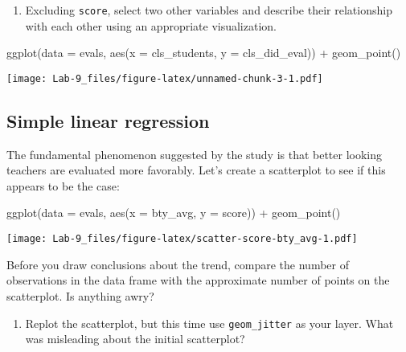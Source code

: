\documentclass[
]{article}
\newenvironment{Shaded}{\begin{snugshade}}{\end{snugshade}}
\newcommand{\AttributeTok}[1]{\textcolor[rgb]{0.77,0.63,0.00}{#1}}
\newcommand{\FunctionTok}[1]{\textcolor[rgb]{0.00,0.00,0.00}{#1}}
\newcommand{\NormalTok}[1]{#1}
\newcommand{\SpecialCharTok}[1]{\textcolor[rgb]{0.00,0.00,0.00}{#1}}
\providecommand{\tightlist}{%
  \setlength{\itemsep}{0pt}\setlength{\parskip}{0pt}}
\begin{document}
\begin{enumerate}
\def\labelenumi{\arabic{enumi}.}
\setcounter{enumi}{2}
\tightlist
\item
  Excluding \texttt{score}, select two other variables and describe
  their relationship with each other using an appropriate visualization.
\end{enumerate}

\begin{Shaded}
\begin{Highlighting}[]
\FunctionTok{ggplot}\NormalTok{(}\AttributeTok{data =}\NormalTok{ evals, }\FunctionTok{aes}\NormalTok{(}\AttributeTok{x =}\NormalTok{ cls\_students, }\AttributeTok{y =}\NormalTok{ cls\_did\_eval)) }\SpecialCharTok{+} \FunctionTok{geom\_point}\NormalTok{()}
\end{Highlighting}
\end{Shaded}

\texttt{[image: Lab-9\_files/figure-latex/unnamed-chunk-3-1.pdf]}

\hypertarget{simple-linear-regression}{%
\subsection{Simple linear regression}\label{simple-linear-regression}}

The fundamental phenomenon suggested by the study is that better looking
teachers are evaluated more favorably. Let's create a scatterplot to see
if this appears to be the case:

\begin{Shaded}
\begin{Highlighting}[]
\FunctionTok{ggplot}\NormalTok{(}\AttributeTok{data =}\NormalTok{ evals, }\FunctionTok{aes}\NormalTok{(}\AttributeTok{x =}\NormalTok{ bty\_avg, }\AttributeTok{y =}\NormalTok{ score)) }\SpecialCharTok{+} \FunctionTok{geom\_point}\NormalTok{()}
\end{Highlighting}
\end{Shaded}

\texttt{[image: Lab-9\_files/figure-latex/scatter-score-bty\_avg-1.pdf]}

Before you draw conclusions about the trend, compare the number of
observations in the data frame with the approximate number of points on
the scatterplot. Is anything awry?

\begin{enumerate}
\def\labelenumi{\arabic{enumi}.}
\setcounter{enumi}{3}
\tightlist
\item
  Replot the scatterplot, but this time use \texttt{geom\_jitter} as
  your layer. What was misleading about the initial scatterplot?
\end{enumerate}
\end{document}

